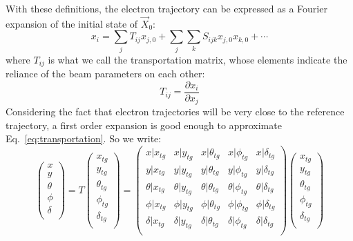 With these definitions, the electron trajectory can be expressed
as a Fourier expansion of the initial state of $\vec{X}_0$:
\begin{equation}
    x_i = \sum_j T_{ij} x_{j,0} + \sum_j \sum_k S_{ijk} x_{j,0}x_{k, 0} + \cdots
    \label{eq:transportation}
\end{equation}
where $T_{ij}$ is what we call the transportation matrix, whose elements indicate
the reliance of the beam parameters on each other: 
\begin{equation}
    T_{ij} = \frac{\partial x_i}{\partial x_j}
\end{equation}
Considering the fact that electron trajectories will be very close to the 
reference trajectory, a first order expansion is good enough to approximate 
Eq.~\ref{eq:transportation}. So we write:
\begin{equation}
    \begin{pmatrix}
	x   \\
	y   \\
	\theta	\\
	\phi	\\
	\delta	\\
    \end{pmatrix}
    =
    T
    \begin{pmatrix}
	x_{tg}   \\
	y_{tg}   \\
	\theta_{tg}	\\
	\phi_{tg}	\\
	\delta_{tg}	\\
    \end{pmatrix}
    =
    \begin{pmatrix}
	x|x_{tg} & x|y_{tg}   & x|\theta_{tg}	& x|\phi_{tg}    & x|\delta_{tg}    \\
	y|x_{tg} & y|y_{tg}   & y|\theta_{tg}	& y|\phi_{tg}    & y|\delta_{tg}    \\
	\theta|x_{tg} & \theta|y_{tg}   & \theta|\theta_{tg}	& \theta|\phi_{tg}    & \theta|\delta_{tg}    \\
	\phi|x_{tg} & \phi|y_{tg}   & \phi|\theta_{tg}	& \phi|\phi_{tg}    & \phi|\delta_{tg}    \\
	\delta|x_{tg} & \delta|y_{tg}   & \delta|\theta_{tg}	& \delta|\phi_{tg}    & \delta|\delta_{tg}    \\
    \end{pmatrix}
    \begin{pmatrix}
	x_{tg}   \\
	y_{tg}   \\
	\theta_{tg}	\\
	\phi_{tg}	\\
	\delta_{tg}	\\
    \end{pmatrix}
\end{equation}
